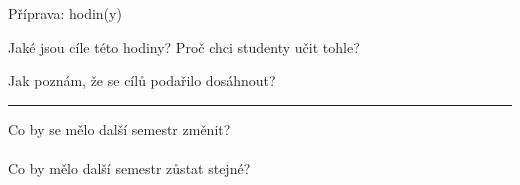 
\chapter{}
\vspace*{-2em}


Příprava:\hspace{1cm} hodin(y)

Jaké jsou cíle této hodiny? Proč chci studenty učit tohle?
\vspace*{1cm}

Jak poznám, že se cílů podařilo dosáhnout?

\hspace*{-1cm}
\rule{}{0.4pt}


\smileys

\goodbadpoints

Co by se mělo další semestr změnit?\\
\\
Co by mělo další semestr zůstat stejné?

\newpage
{}
\vspace*{-2em}
